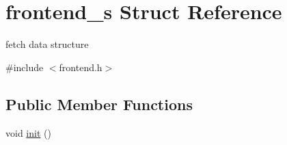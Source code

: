 \hypertarget{structfrontend__s}{
\section{frontend\_\-s Struct Reference}
\label{structfrontend__s}
}


fetch data structure  




{\ttfamily \#include $<$frontend.h$>$}

\subsection*{Public Member Functions}
\begin{DoxyCompactItemize}
\item 
void \hyperlink{structfrontend__s_aa8924323b6538859e5d896b1a02de550}{init} ()
\end{DoxyCompactItemize}
